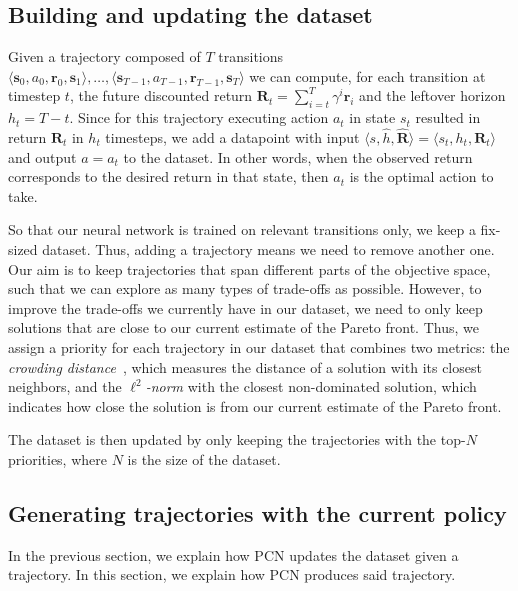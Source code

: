 \documentclass{article}
\renewcommand{\cite}[1]{\citep{#1}}
\newcommand{\mdpstate}{\mathbf{s}}
\newcommand{\action}{a}
\newcommand{\ltuple}{\langle}
\newcommand{\rtuple}{\rangle}
\begin{document}
\subsection{Building and updating the dataset}
\label{sec:pcn-building-dataset}

Given a trajectory composed of $T$ transitions $\ltuple \mdpstate_0, \action_0, \bm{r}_0, \mdpstate_1\rtuple, \dots, \ltuple \mdpstate_{T-1}, \action_{T-1}, \bm{r}_{T-1}, \mdpstate_T\rtuple$ we can compute, for each transition at timestep $t$, the future discounted return $\bm{R}_t = \sum_{i=t}^T \gamma^i\bm{r}_i$ and the leftover horizon $h_t = T-t$. Since for this trajectory executing action $a_t$ in state $s_t$ resulted in return $\mathbf{R}_t$ in $h_t$ timesteps, we add a datapoint with input $\langle s, \hat{h}, \mathbf{\hat{R}}\rangle = \langle s_t, h_t, \mathbf{R}_t \rangle$ and output $a=a_t$ to the dataset. In other words, when the observed return corresponds to the desired return in that state, then $a_t$ is the optimal action to take.

So that our neural network is trained on relevant transitions only, we keep a fix-sized dataset. Thus, adding a trajectory means we need to remove another one. Our aim is to keep trajectories that span different parts of the objective space, such that we can explore as many types of trade-offs as possible. However, to improve the trade-offs we currently have in our dataset, we need to only keep solutions that are close to our current estimate of the Pareto front. Thus, we assign a priority for each trajectory in our dataset that combines two metrics: the \emph{crowding distance}~\cite{deb2000}, which measures the distance of a solution with its closest neighbors, and the \emph{$\ell^2$-norm} with the closest non-dominated solution, which indicates how close the solution is from our current estimate of the Pareto front.

The dataset is then updated by only keeping the trajectories with the top-$N$ priorities, where $N$ is the size of the dataset.

\subsection{Generating trajectories with the current policy}
\label{sec:pcn-policy-exploration}

In the previous section, we explain how PCN updates the dataset given a trajectory. In this section, we explain how PCN produces said trajectory.
\end{document}
